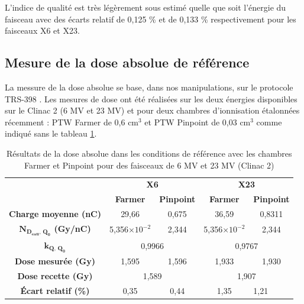 \documentclass{article}
\begin{document}
L'indice de qualité est très légèrement sous estimé quelle que soit l'énergie du faisceau avec des écarts relatif de 0,125 \% et de 0,133 \% respectivement pour les faisceaux X6 et X23.

\subsection{Mesure de la dose absolue de référence}

La messure de la dose absolue se base, dans nos manipulations, sur le protocole TRS-398 \cite{international2001iaea}. Les mesures de dose ont été réalisées sur les deux énergies disponibles sur le Clinac 2 (6 MV et 23 MV) et pour deux chambres d'ionnisation étalonnées récemment : PTW  Farmer de 0,6 cm$^3$ et PTW Pinpoint de 0,03 cm$^3$ comme indiqué sans le tableau \ref*{table_dose_abs_resultats}.

\begin{table}[h!]
  \centering
  \begin{tabular}{c|cc|cc|}
  \cline{2-5}
                                             & \multicolumn{2}{c|}{\textbf{X6}}    & \multicolumn{2}{c|}{\textbf{X23}}   \\ \cline{2-5} 
                                             & \textbf{Farmer} & \textbf{Pinpoint} & \textbf{Farmer} & \textbf{Pinpoint} \\ \hline
  \multicolumn{1}{|c|}{\textbf{Charge moyenne (nC)}} & 29,66           & 0,675             & 36,59           & 0,8311            \\
  \multicolumn{1}{|c|}{\textbf{$\mathbf{N_{D_{eau},\, Q_0}}$ (Gy/nC)}} & 5,356$\times 10^{-2}$ & 2,344 & 5,356$\times 10^{-2}$ & 2,344                     \\
  \multicolumn{1}{|c|}{\textbf{$\mathbf{k_{Q,\, Q_0}}$}}       & \multicolumn{2}{c|}{0,9966}   & \multicolumn{2}{c|}{0,9767}                       \\
  \multicolumn{1}{|c|}{\textbf{Dose mesurée (Gy)}}   & 1,595           & 1,596             & 1,933            & 1,930             \\
  \multicolumn{1}{|c|}{\textbf{Dose recette (Gy)}}             & \multicolumn{2}{c|}{1,589}    & \multicolumn{2}{c|}{1,907}                        \\
  \multicolumn{1}{|c|}{\textbf{Écart relatif (\%)}}            & 0,35                  & 0,44  & 1,35                  & \multicolumn{1}{l|}{1,21} \\ \hline
  \end{tabular}
  \caption{Résultats de la dose absolue dans les conditions de référence avec les chambres Farmer et Pinpoint pour des faisceaux de 6 MV et 23 MV (Clinac 2)}
  \label{table_dose_abs_resultats}
\end{table}
\end{document}
